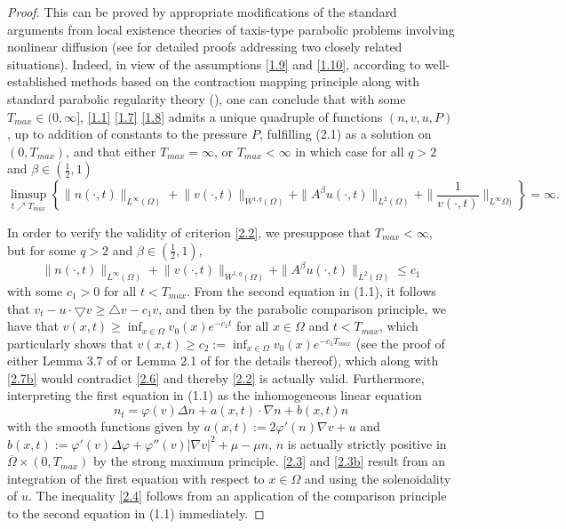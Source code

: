 \documentclass[12pt]{article}
\theoremstyle{plain}
\theoremstyle{definition}
\numberwithin{equation}{section}
\begin{document}
\begin{proof}[Proof]
This can  be  proved by  appropriate modifications of the standard arguments from local existence theories of taxis-type parabolic problems involving nonlinear diffusion (see \cite{WinklerNARWA,WinklerCPDE,HYJin}  for detailed proofs addressing two closely related situations).  Indeed, in view of the assumptions \eqref{1.9} and \eqref{1.10},  according to well-established methods based on the contraction mapping principle  along
with standard parabolic regularity theory (\cite{Amann}), one can conclude that with some $T_{max}\in (0,\infty]$,  \eqref{1.1} \eqref{1.7} \eqref{1.8} admits a unique quadruple of functions $ (n, v, u, P)$, up to addition of constants to  the pressure $P$, fulfilling (2.1) as a solution on
$(0, T_{max})$, and that either $T_{max}=\infty$, or $T_{max}<\infty$ in which case for all $q>2$ and $\beta\in (\frac12,1)$
	\begin{equation}\label{2.6}
		\limsup\limits_{t\nearrow T_{max}}\left\{ \|n(\cdot,t)\|_{L^{\infty}(\Omega)}\!
+\!\|v(\cdot,t)\|_{W^{1,q}(\Omega)}+\|A^\beta u(\cdot,t)\|_{L^2(\Omega)}
+ \|\frac1{v(\cdot,t)}\|_{L^{\infty}\Omega)}\right\}=\infty.
	\end{equation}


In order to verify the validity of criterion  \eqref{2.2}, we presuppose that
$T_{max}<\infty$, but for some $q>2$ and $\beta\in (\frac12,1)$,
	\begin{equation}\label{2.7b}
	\|n(\cdot,t)\|_{L^{\infty}(\Omega)}\!
+\!\|v(\cdot,t)\|_{W^{1,q}(\Omega)}+\|A^\beta u(\cdot,t)\|_{L^2(\Omega)}\leq c_1
	\end{equation}	
with some $c_1>0$ for all $t<T_{max}$. From the second equation in (1.1), it follows that $v_t-u\cdot \bigtriangledown v\geq \bigtriangleup v -c_1 v$, and then by the parabolic comparison principle,  we have
 that
$v(x,t)\geq \inf_{x\in\Omega} v_0(x) e^{- c_1 t}$ for all $x\in \Omega$ and $t<T_{max}$, which particularly shows that $v(x,t)\geq c_2:=\inf_{x\in\Omega} v_0(x) e^{- c_1 T_{max}}$ (see the proof of either Lemma 3.7 of \cite{Fuest} or Lemma 2.1 of \cite{WinklerNARWA}  for the details thereof), which along with \eqref{2.7b} would contradict \eqref{2.6} and thereby \eqref{2.2} is actually valid.
Furthermore, interpreting  the first equation in (1.1) as the inhomogeneous linear equation
$$
n_t=\varphi(v) \Delta n+a(x,t)\cdot \nabla n + b(x,t) n
$$
with the smooth functions given by
$a(x,t):= 2\varphi'(n)\nabla v+u$ and    $b(x,t):=\varphi'(v) \Delta\varphi +\varphi''(v)|\nabla v|^2+\mu-\mu n$, $n $ is actually strictly positive in $\overline \Omega\times (0, T_{max})$  by the strong maximum principle.  \eqref{2.3} and \eqref{2.3b} result from an integration of the first equation with respect to $x\in\Omega$ and using the solenoidality of $u$.  The inequality \eqref {2.4} follows from
an application of the comparison principle to the second equation in (1.1) immediately.
\end{proof}
\end{document}
